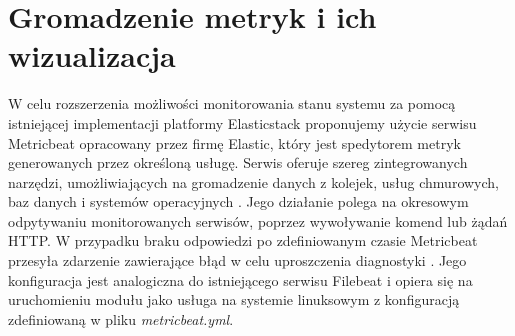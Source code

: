 \section{Gromadzenie metryk i ich wizualizacja}
W celu rozszerzenia możliwości monitorowania stanu systemu za pomocą istniejącej implementacji platformy Elasticstack proponujemy użycie serwisu Metricbeat opracowany przez firmę Elastic, który jest spedytorem metryk generowanych przez określoną usługę. Serwis oferuje szereg zintegrowanych narzędzi, umożliwiających na gromadzenie danych z kolejek, usług chmurowych, baz danych i systemów operacyjnych \cite{metricbeat}. Jego działanie polega na okresowym odpytywaniu monitorowanych serwisów, poprzez wywoływanie komend lub żądań HTTP. W przypadku braku odpowiedzi po zdefiniowanym czasie Metricbeat przesyła zdarzenie zawierające błąd w celu uproszczenia diagnostyki \cite{metricbeat_work}. Jego konfiguracja jest analogiczna do istniejącego serwisu Filebeat i opiera się na uruchomieniu modułu jako usługa na systemie linuksowym z konfiguracją zdefiniowaną w pliku \textit{metricbeat.yml}.
